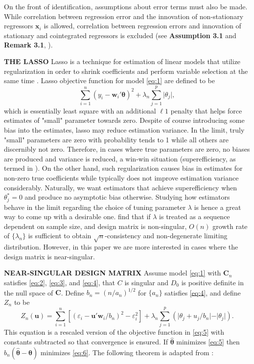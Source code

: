 \documentclass[12pt,a4paper]{article}
\DeclareMathOperator*{\argmin}{arg\,min} %
\begin{document}
On the front of identification, assumptions about error terms must also be made. While correlation between regression error and the innovation of non-stationary regressors $ \bm{x}_i $ is allowed, correlation between regression errors and innovation of stationary and cointegrated regressors is excluded (see \textbf{Assumption 3.1} and \textbf{Remark 3.1}, \cite{lee2018lasso}).


\textbf{THE LASSO}
Lasso is a technique for estimation of linear models that utilize regularization in order to shrink coefficients and perform variable selection at the same time \citep{tibshirani1996regression}. Lasso objective function for model \eqref{eq:1} are defined to be
\begin{equation}\label{eq:5}
	\sum_{i = 1}^n(y_i - \bm{w}_i'\bm{\theta})^2 + 
	\lambda_n\sum_{j = 1}^p\vert\theta_j\vert,
\end{equation}
which is essentially least square with an additional $ \ell1 $ penalty that helps force estimates of "small" parameter towards zero. Despite of course introducing some bias into the estimates, lasso may reduce estimation variance. In the limit, truly "small" parameters are zero with probability tends to 1 while all others are discernibly not zero. Therefore, in cases where true parameters are zero, no biases are produced and variance is reduced, a win-win situation (superefficiency, as termed in \cite{knight2008shrinkage}). On the other hand, such regularization causes bias in estimates for non-zero true coefficients while typically does not improve estimation variance considerably. Naturally, we want estimators that achieve superefficiency when $ \theta^*_j = 0 $ and produce no asymptotic bias otherwise. Studying how estimators behave in the limit regarding the choice of tuning parameter $ \lambda $ is hence a great way to come up with a desirable one. 
\cite{knight2000asymptotics} find that if $ \lambda $ is treated as a sequence dependent on sample size, and design matrix is non-singular, $ O(n) $ growth rate of $ \{\lambda_n\} $ is sufficient to obtain $ \sqrt{n} $-consistency and non-degenerate limiting distribution. However, in this paper we are more interested in cases where the design matrix is near-singular.

\textbf{NEAR-SINGULAR DESIGN MATRIX}
Assume model \eqref{eq:1} with $ \bm{C}_n $ satisfies \eqref{eq:2}, \eqref{eq:3}, and \eqref{eq:4}, that $ C $ is singular and $ D_0 $ is positive definite in the null space of $ \bm{C} $. Define $ b_n = (n/a_n)^{1/2} $ for $ \{a_n\} $ satisfies \eqref{eq:4}, and define $ Z_n $ to be
\begin{equation}\label{eq:6}
	Z_n(\bm{u}) = 
	\sum_{i = 1}^n[(\varepsilon_i - \bm{u}'\bm{w}_i/b_n)^2 - \varepsilon_i^2] +
	\lambda_n\sum_{j = 1}^{p}(\vert\theta_j + u_j/b_n\vert - \vert\theta_j\vert).
\end{equation}
This equation is a rescaled version of the objective function in \eqref{eq:5} with constants subtracted so that convergence is ensured. If $ \hat{\bm{\theta}} $ minimizes \eqref{eq:5} then $ b_n(\hat{\bm{\theta}} - \bm{\theta}) $ minimizes \eqref{eq:6}. The following theorem is adapted from \cite{knight2000asymptotics}:
\end{document}
